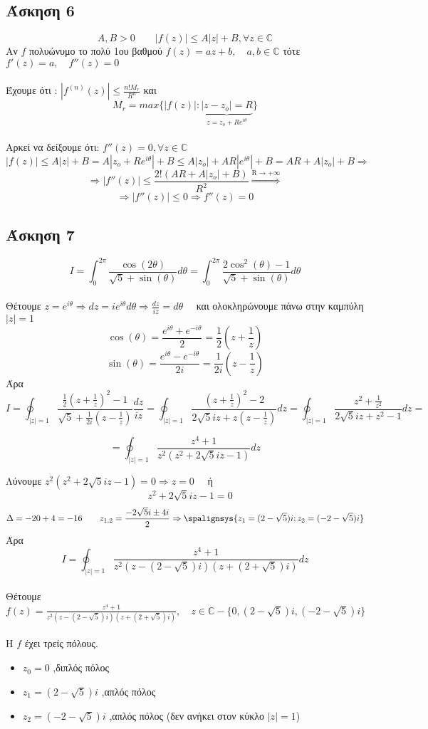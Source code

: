 \documentclass[12pt]{article}
\begin{document}
 \subsection{Άσκηση 6}
$$
A,B > 0  \qquad |f(z)|\leqslant A|z|+B,\forall z \in \mathbb{C}
$$
Αν $f$ πολυώνυμο το πολύ 1ου βαθμού 
$f(z)=az+b,\quad a,b\in \mathbb{C}$ τότε 
$f'(z)=a,\quad f''(z)=0$
\\ \\
Έχουμε ότι : $|f^{(n)}(z)|\leqslant \frac{n!M_r}{R^n}$ και 
\[
M_r=max\{|f(z)|:
\underbrace{|z-z_o|=R}_{\text{$z=z_o+Re^{i\theta}$}}
\}
\]
\\
Αρκεί να δείξουμε ότι: $f''(z)=0,\forall z \in \mathbb{C}$
$$
|f(z)|\leqslant A|z|+B=A|z_o+Re^{i\theta}|+B
\leqslant A|z_o|+AR|e^{i\theta}|+B=
AR+A|z_o|+B
\Rightarrow$$
$$\Rightarrow
|f''(z)|\leqslant\frac{2!(AR+A|z_o|+B)}{R^2}
\overset{\mathrm{R\rightarrow +\infty}}{\Rightarrow} $$
$$ \Rightarrow |f''(z)|\leqslant0 \Rightarrow f''(z)=0$$

\newpage
 \subsection{Άσκηση 7}
$$
I=\int_{0}^{2\pi} \frac{\cos{(2 \theta)}}{\sqrt{5}+\sin{(\theta)}} d \theta=\int_{0}^{2\pi} \frac{2\cos^2{(\theta)}-1}{\sqrt{5}+\sin{(\theta)}} d \theta
$$  \\
Θέτουμε $z=e^{i\theta}\Rightarrow dz=ie^{i\theta}d\theta \Rightarrow \frac{dz}{iz}=d\theta \quad$ και ολοκληρώνουμε πάνω στην καμπύλη $|z|=1$
$$ \cos(\theta)=\frac{e^{i\theta}+e^{-i \theta}}{2}=\frac{1}{2} \left( z + \frac{1}{z} \right) $$
$$ \sin(\theta)=\frac{e^{i\theta}-e^{-i \theta}}{2i}=\frac{1}{2i} \left( z - \frac{1}{z} \right) $$
Άρα 
$$ Ι= \oint_{|z|=1}^{ } \frac{\frac{1}{2}\left( z + \frac{1}{z} \right)^2-1}{\sqrt{5}+\frac{1}{2i} \left( z - \frac{1}{z} \right)} \frac{dz}{iz} = 
\oint_{|z|=1}^{ } \frac{\left( z + \frac{1}{z} \right)^2-2}{2\sqrt{5}iz+z \left( z - \frac{1}{z} \right)} dz =
\oint_{|z|=1}^{ } \frac{ z^2 + \frac{1}{z^2} }{2\sqrt{5}iz+z^2-1} dz = $$

$$ =\oint_{|z|=1}^{ } \frac{ z^4 + 1 }{z^2(z^2+2\sqrt{5}iz-1)} dz $$

Λύνουμε $z^2(z^2+2\sqrt{5}iz-1)=0 \Rightarrow z=0\quad$ ή
$$\quad z^2+2\sqrt{5}iz-1=0 $$
$$ \Delta=-20+4=-16 \qquad z_{1,2}=\frac{-2\sqrt{5}i\pm 4i}{2} \Rightarrow \spalignsys{z_1=(2-\sqrt{5})i;z_2=(-2-\sqrt{5})i} $$ 
Άρα 
$$ Ι=\oint_{|z|=1} \frac{ z^4 + 1 }{z^2(z-(2-\sqrt{5})i)(z+(2+\sqrt{5})i)} dz $$
\\
Θέτουμε $f(z)=\frac{ z^4 + 1 }{z^2(z-(2-\sqrt{5})i)(z+(2+\sqrt{5})i)},\quad z\in\mathbb{C}-\{0,(2-\sqrt{5})i,(-2-\sqrt{5})i\} $
\\ \\
Η $f$ έχει τρείς πόλους.
\begin{itemize}
\item $z_0=0$ ,διπλός πόλος
\item $z_1=(2-\sqrt{5})i$ ,απλός πόλος
\item $z_2=(-2-\sqrt{5})i$ ,απλός πόλος (δεν ανήκει στον κύκλο $|z|=1$)
\\
\end{itemize}
\end{document}
